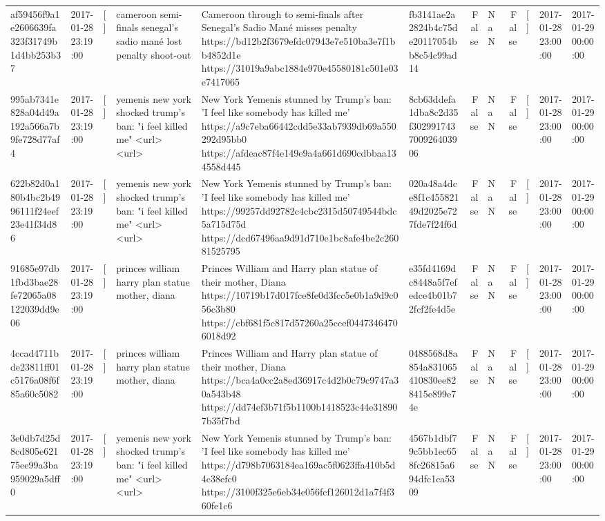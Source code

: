 \begin{tabular}{llllllrlrlll}
af59456f9a1e2606639fa323f31749b1d4bb253b37 & 2017-01-28 23:19:00 & [] & cameroon semi-finals senegal's sadio mané lost penalty shoot-out & Cameroon through to semi-finals after Senegal’s Sadio Mané misses penalty https://bd12b2f3679efdc07943e7e510ba3e7f1bb4852d1e https://31019a9abc1884e970e45580181c501e03e7417065 & fb3141ae2a2824b4c75de20117054bb8c54c99ad14 & False & NaN & False & [] & 2017-01-28 23:00:00 & 2017-01-29 00:00:00 \\
995ab7341e828a04d49a192a566a7b9fe728d77af4 & 2017-01-28 23:19:00 & [] & yemenis new york shocked trump's ban: "i feel killed me" <url> <url> & New York Yemenis stunned by Trump's ban: 'I feel like somebody has killed me' https://a9c7eba66442cdd5e33ab7939db69a550292d95bb0 https://afdeac87f4e149e9a4a661d690cdbbaa134558d445 & 8cb63ddefa1dba8c2d35f302991743700926403906 & False & NaN & False & [] & 2017-01-28 23:00:00 & 2017-01-29 00:00:00 \\
622b82d0a180b4bc2b4996111f24eef23e41f34d86 & 2017-01-28 23:19:00 & [] & yemenis new york shocked trump's ban: "i feel killed me" <url> <url> & New York Yemenis stunned by Trump's ban: 'I feel like somebody has killed me' https://99257dd92782c4cbc2315d50749544bdc5a715d75d https://dcd67496aa9d91d710e1bc8afe4be2c26081525795 & 020a48a4dce8f1c45582149d2025e727fde7f24f6d & False & NaN & False & [] & 2017-01-28 23:00:00 & 2017-01-29 00:00:00 \\
91685e97db1fbd3bae28fe72065a08122039dd9e06 & 2017-01-28 23:19:00 & [] & princes william harry plan statue mother, diana & Princes William and Harry plan statue of their mother, Diana https://10719b17d017fce8fe0d3fcc5e0b1a9d9c056c3b80 https://cbf681f5c817d57260a25ccef04473464706018d92 & e35fd4169dc8448a5f7efedce4b01b72fcf2fe4d5e & False & NaN & False & [] & 2017-01-28 23:00:00 & 2017-01-29 00:00:00 \\
4ccad4711bde23811ff01c5176a08f6f85a60c5082 & 2017-01-28 23:19:00 & [] & princes william harry plan statue mother, diana & Princes William and Harry plan statue of their mother, Diana https://bca4a0cc2a8ed36917c4d2b0c79c9747a30a543b48 https://dd74ef3b71f5b1100b1418523c44e318907b35f7bd & 0488568d8a854a831065410830ee828415e899e74e & False & NaN & False & [] & 2017-01-28 23:00:00 & 2017-01-29 00:00:00 \\
3e0db7d25d8cd805e62175ee99a3ba959029a5dff0 & 2017-01-28 23:19:00 & [] & yemenis new york shocked trump's ban: "i feel killed me" <url> <url> & New York Yemenis stunned by Trump's ban: 'I feel like somebody has killed me' https://d798b7063184ea169ac5f0623ffa410b5d4c38efc0 https://3100f325e6eb34e056fcf126012d1a7f4f360fe1c6 & 4567b1dbf79c5bb1ec658fc26815a694dfc1ca5309 & False & NaN & False & [] & 2017-01-28 23:00:00 & 2017-01-29 00:00:00 \\

\end{tabular}
